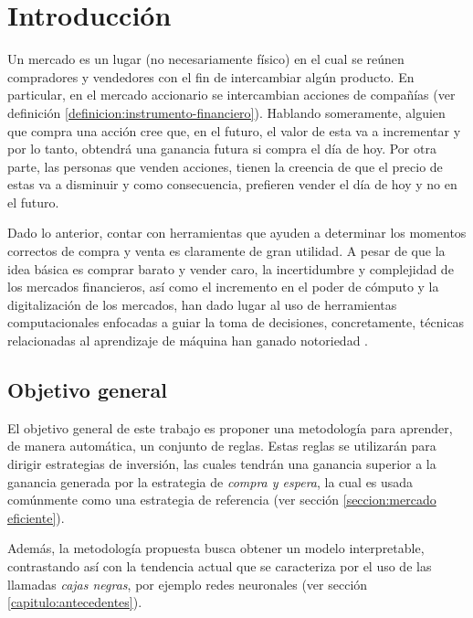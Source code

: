 \documentclass[12pt]{report}
\theoremstyle{break}
\theoremstyle{break}
\begin{document}
\chapter[Capítulo \thechapter: Introducción]{Introducción}
\label{capitulo:introduccion}
Un mercado es un lugar (no necesariamente físico) en el cual se reúnen compradores y vendedores con el fin de intercambiar algún producto. En particular, en el mercado accionario se intercambian acciones de compañías (ver definición \ref{definicion:instrumento-financiero}). Hablando someramente, alguien que compra una acción cree que, en el futuro, el valor de esta va a incrementar y por lo tanto, obtendrá una ganancia futura si compra el día de hoy. Por otra parte, las personas que venden acciones, tienen la creencia de que el precio de estas va a disminuir y como consecuencia, prefieren vender el día de hoy y no en el futuro.

Dado lo anterior, contar con herramientas que ayuden a determinar los momentos correctos de compra y venta es claramente de gran utilidad. A pesar de que la idea básica es comprar barato y vender caro, la incertidumbre y complejidad de los mercados financieros, así como el incremento en el poder de cómputo y la digitalización de los mercados, han dado lugar al uso de herramientas computacionales enfocadas a guiar la toma de decisiones, concretamente, técnicas relacionadas al aprendizaje de máquina han ganado notoriedad \cite{AdvancesMLFinance}.

\section{Objetivo general}
\label{seccion:objetivo general}
El objetivo general de este trabajo es proponer una metodología para aprender, de manera automática, un conjunto de reglas. Estas reglas se utilizarán para dirigir estrategias de inversión, las cuales tendrán una ganancia superior a la ganancia generada por la estrategia de \textit{compra y espera}, la cual es usada comúnmente como una estrategia de referencia (ver sección \ref{seccion:mercado eficiente}).

Además, la metodología propuesta busca obtener un modelo interpretable, contrastando así con la tendencia actual que se caracteriza por el uso de las llamadas \textit{cajas negras}, por ejemplo redes neuronales (ver sección \ref{capitulo:antecedentes}).
\end{document}
